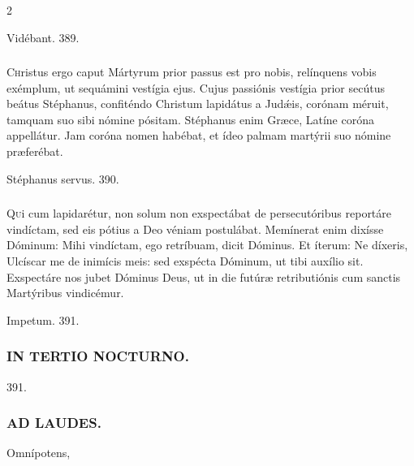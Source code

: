 \documentclass[9pt,twoside]{extarticle}
\begin{document}
\begin{multicols}{2}
\begin{tightlist}{}
\item {} Vidébant. 389.
\end{tightlist}

\subsubsection*{\center {}}
\lettrine{C}hristus ergo caput Mártyrum prior passus est pro nobis, relínquens vobis exémplum, ut sequámini vestígia ejus. Cujus passiónis vestígia prior secútus beátus Stéphanus, confiténdo Christum lapidátus a Judǽis, corónam méruit, tamquam suo sibi nómine pósitam. Stéphanus enim Græce, Latíne coróna appellátur. Jam coróna nomen habébat, et ídeo palmam martýrii suo nómine præferébat. 

\begin{tightlist}{}
\item {} Stéphanus servus. 390.
\end{tightlist}

\subsubsection*{\center {}}
\lettrine{Q}ui cum lapidarétur, non solum non exspectábat de persecutóribus reportáre vindíctam, sed eis pótius a Deo véniam postulábat. Memínerat enim dixísse Dóminum: Mihi vindíctam, ego retríbuam, dicit Dóminus. Et íterum: Ne díxeris, Ulcíscar me de inimícis meis: sed exspécta Dóminum, ut tibi auxílio sit. Exspectáre nos jubet Dóminus Deus, ut in die futúræ retributiónis cum sanctis Martýribus vindicémur. 

\begin{tightlist}{}
\item {} Impetum. 391.
\end{tightlist}

\subsubsection*{\center \textsc{IN TERTIO NOCTURNO.}}
\begin{tightlist}{}
\item {} 391.
\end{tightlist}

\subsubsection*{\center \textsc{AD LAUDES.}}
\begin{tightlist}{}
\item {} Omnípotens, 
\end{tightlist}

\end{multicols}
\end{document}
